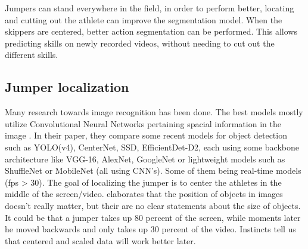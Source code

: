Jumpers can stand everywhere in the field, in order to perform better, locating and cutting out the athlete can improve the segmentation model. When the skippers are centered, better action segmentation can be performed. This allows predicting skills on newly recorded videos, without needing to cut out the different skills.

\subsection{Jumper localization}
\label{subsec:jumper localization}

    
Many research towards image recognition has been done. The best models mostly utilize Convolutional Neural Networks pertaining spacial information in the image \autocite{Zaidi_2021}. In their paper, they compare some recent models for object detection such as YOLO(v4), CenterNet, SSD, EfficientDet-D2, each using some backbone architecture like VGG-16, AlexNet, GoogleNet or lightweight models such as ShuffleNet or MobileNet (all using CNN's). Some of them being real-time models (fps > 30).
The goal of localizing the jumper is to center the athletes in the middle of the screen/video. \textcite{Bharadiya_2023} elaborates that the position of objects in images doesn't really matter, but their are no clear statements about the size of objects. It could be that a jumper takes up 80 percent of the screen, while moments later he moved backwards and only takes up 30 percent of the video. Instincts tell us that centered and scaled data will work better later.

